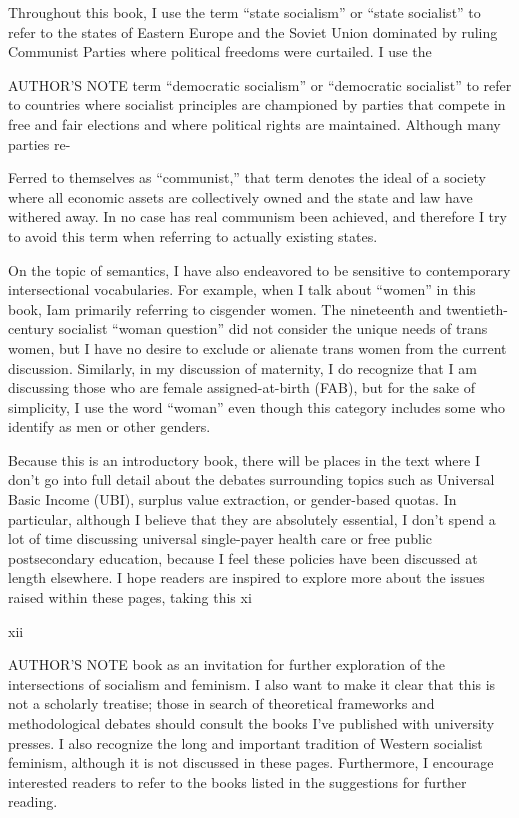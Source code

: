  \par 
Throughout this book, I use the term “state socialism” or “state socialist” to refer to the states of Eastern Europe and the Soviet Union dominated by ruling Communist Parties where political freedoms were curtailed. I use the
 \par 
AUTHOR'S NOTE term “democratic socialism” or “democratic socialist” to refer to countries where socialist principles are championed by parties that compete in free and fair elections and where political rights are maintained. Although many parties re-
 \par 
Ferred to themselves as “communist,” that term denotes the ideal of a society where all economic assets are collectively owned and the state and law have withered away. In no case has real communism been achieved, and therefore I try to avoid this term when referring to actually existing states.
 \par 
On the topic of semantics, I have also endeavored to be sensitive to contemporary intersectional vocabularies. For example, when I talk about “women” in this book, Iam primarily referring to cisgender women. The nineteenth and twentieth-century socialist “woman question” did not consider the unique needs of trans women, but I have no desire to exclude or alienate trans women from the current discussion. Similarly, in my discussion of maternity, I do recognize that I am discussing those who are female assigned-at-birth (FAB), but for the sake of simplicity, I use the word “woman” even though this category includes some who identify as men or other genders.
 \par 
Because this is an introductory book, there will be places in the text where I don’t go into full detail about the debates surrounding topics such as Universal Basic Income (UBI), surplus value extraction, or gender-based quotas. In particular, although I believe that they are absolutely essential, I don’t spend a lot of time discussing universal single-payer health care or free public postsecondary education, because I feel these policies have been discussed at length elsewhere. I hope readers are inspired to explore more about the issues raised within these pages, taking this xi
 \par 
xii
 \par 
AUTHOR'S NOTE book as an invitation for further exploration of the intersections of socialism and feminism. I also want to make it clear that this is not a scholarly treatise; those in search of theoretical frameworks and methodological debates should consult the books I’ve published with university presses. I also recognize the long and important tradition of Western socialist feminism, although it is not discussed in these pages. Furthermore, I encourage interested readers to refer to the books listed in the suggestions for further reading.
